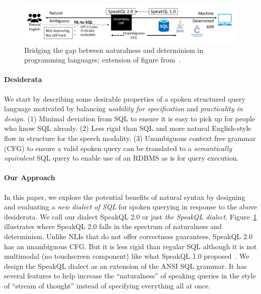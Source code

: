 

\begin{figure}[t]
  \centering
  \includegraphics[width=\linewidth]{figures/naturalness and languages.png}
  \caption{Bridging the gap between naturalness and determinism in programming languages; extension of figure from~\cite{Shah2020}.}
  \label{fig:cliffdiagram}
\end{figure}


\paragraph{\textbf{Desiderata}} 
We start by describing some desirable properties of a spoken structured query language motivated by balancing \textit{usability for specification} and \textit{practicality in design}.
(1) Minimal deviation from SQL to ensure it is easy to pick up for people who know SQL already. 
(2) Less rigid than SQL and more natural English-style flow in structure for the speech modality. 
(3) Unambiguous context free grammar (CFG) to ensure a valid spoken query can be translated to a \textit{semantically equivalent} SQL query to enable use of an RDBMS as is for query execution.



\paragraph{\textbf{Our Approach}}
In this paper, we explore the potential benefits of natural syntax by designing and evaluating a \textit{new dialect of SQL} for spoken querying in response to the above desiderata. We call our dialect SpeakQL 2.0 or just \textit{the SpeakQL dialect}.
Figure~\ref{fig:cliffdiagram} illustrates where SpeakQL 2.0 falls in the spectrum of naturalness and determinism. 
Unlike NLIs that do not offer correctness guarantees, SpeakQL 2.0 has an unambiguous CFG. 
But it is less rigid than regular SQL although it is not multimodal (no touchscreen component) like what SpeakQL 1.0 proposed~\cite{Shah2020}.
We design the SpeakQL dialect as an extension of the ANSI SQL grammar. 
It has several features to help increase the ``naturalness'' of speaking queries in the style of ``stream of thought'' instead of specifying everything all at once.


